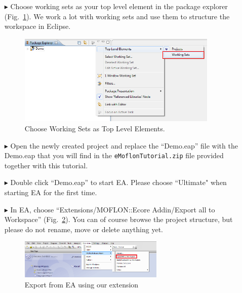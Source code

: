 \begin{enumerate}
\item[$\blacktriangleright$] Choose working sets as your top level element in
the package explorer (Fig.~\ref{fig_eclipseWorkingsets}).
We work a lot with working sets and use them to structure the workspace in
Eclipse.
\begin{figure}[!h]
	\centering
  \includegraphics[width=0.9\textwidth]{pics/eclipse_workingsets.png}
	\caption{Choose Working Sets as Top Level Elements.}
	\label{fig_eclipseWorkingsets}
\end{figure}

\item[$\blacktriangleright$] Open the newly created project and replace the
``Demo.eap'' file with the Demo.eap that you will find in the
\texttt{eMoflonTutorial.zip} file provided together with this tutorial. 

\item[$\blacktriangleright$] Double click ``Demo.eap'' to start EA.
Please choose ``Ultimate" when starting EA for the first time.

\item[$\blacktriangleright$] In EA, choose ``Extensions/MOFLON::Ecore Addin/Export
all to Workspace'' (Fig.~\ref{fig_ea}).  You can of course browse the project
structure, but please do not rename, move or delete anything yet.
\begin{figure}[!h]
	\centering
  \includegraphics[width=0.65\textwidth]{pics/installationAndSetup/ea_firststart}
	\caption{Export from EA using our extension} 
	\label{fig_ea} 
\end{figure}

\newpage


\end{enumerate}
